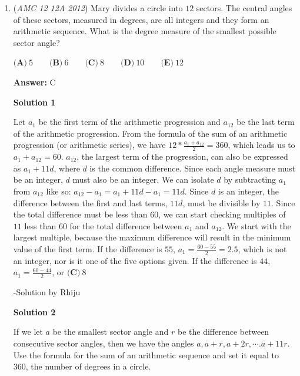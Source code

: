 \begin{enumerate}
 To isolate $b$, We add the first and last equations and then subtract the second one.

 $(a+b)+(b+c)-(a+c) = 12+19-17 \Rightarrow 2b=14 \Rightarrow b = 7$

 Because $b$ is the middle number, the middle number is $\boxed{\textbf{(D)}\ 7}$



	\item (\textit{AMC 12 12A 2012}) Mary divides a circle into $12$ sectors.  The central angles of these sectors, measured in degrees, are all integers and they form an arithmetic sequence.  What is the degree measure of the smallest possible sector angle?


 $\textbf{(A)}\ 5\qquad\textbf{(B)}\ 6\qquad\textbf{(C)}\ 8\qquad\textbf{(D)}\ 10\qquad\textbf{(E)}\ 12$

 \textbf{Answer: }C



\textbf{Solution 1}

Let $a_1$ be the first term of the arithmetic progression and $a_{12}$ be the last term of the arithmetic progression. From the formula of the sum of an arithmetic progression (or arithmetic series), we have $12*\frac{a_1+a_{12}}{2}=360$, which leads us to $a_1 + a_{12} = 60$. $a_{12}$, the largest term of the progression, can also be expressed as $a_1+11d$, where $d$ is the common difference. Since each angle measure must be an integer, $d$ must also be an integer. We can isolate $d$ by subtracting $a_1$ from $a_{12}$ like so: $a_{12}-a_1=a_1+11d-a_1=11d$. Since $d$ is an integer, the difference between the first and last terms, $11d$, must be divisible by $11.$ Since the total difference must be less than $60$, we can start checking multiples of $11$ less than $60$ for the total difference between $a_1$ and $a_{12}$. We start with the largest multiple, because the maximum difference will result in the minimum value of the first term. If  the difference is $55$, $a_1=\frac{60-55}{2}=2.5$, which is not an integer, nor is it one of the five options given. If the difference is $44$, $a_1=\frac{60-44}{2}$, or $\boxed{\textbf{(C)}\ 8}$

 -Solution by Rhiju

 



\textbf{Solution 2}

If we let $a$ be the smallest sector angle and $r$ be the difference between consecutive sector angles, then we have the angles $a, a+r, a+2r, \cdots. a+11r$. Use the formula for the sum of an arithmetic sequence and set it equal to 360, the number of degrees in a circle.


\end{enumerate}
